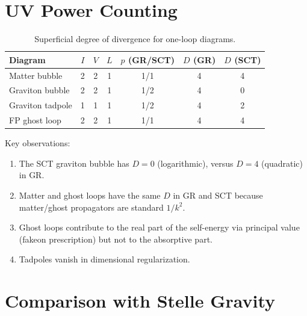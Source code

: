 \documentclass[11pt,a4paper]{article}
\theoremstyle{definition}
\theoremstyle{remark}
\begin{document}
\section{UV Power Counting}
\label{sec:uv}

\begin{table}[H]
\centering
\caption{Superficial degree of divergence for one-loop diagrams.}
\begin{tabular}{@{}lcccccc@{}}
\toprule
Diagram & $I$ & $V$ & $L$ & $p$ (GR/SCT) & $D$ (GR) & $D$ (SCT) \\
\midrule
Matter bubble     & 2 & 2 & 1 & 1/1 & 4 & 4 \\
Graviton bubble   & 2 & 2 & 1 & 1/2 & 4 & 0 \\
Graviton tadpole  & 1 & 1 & 1 & 1/2 & 4 & 2 \\
FP ghost loop     & 2 & 2 & 1 & 1/1 & 4 & 4 \\
\bottomrule
\end{tabular}
\end{table}

Key observations:
\begin{enumerate}
  \item The SCT graviton bubble has $D = 0$ (logarithmic), versus $D = 4$
        (quadratic) in GR.
  \item Matter and ghost loops have the same $D$ in GR and SCT because
        matter/ghost propagators are standard $1/k^2$.
  \item Ghost loops contribute to the real part of the self-energy via
        principal value (fakeon prescription) but not to the absorptive part.
  \item Tadpoles vanish in dimensional regularization.
\end{enumerate}

\section{Comparison with Stelle Gravity}
\label{sec:stelle}
\end{document}
